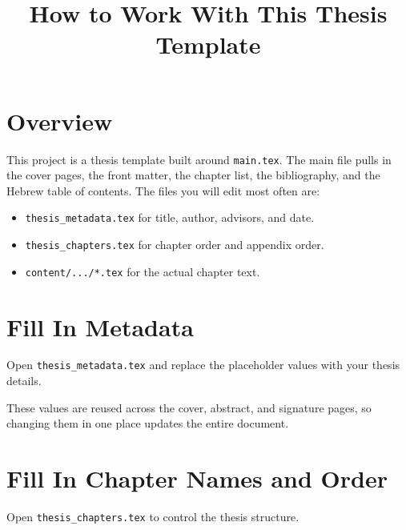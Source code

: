 \documentclass[11pt,a4paper]{article}
\title{How to Work With This Thesis Template}
\author{}
\date{}
\begin{document}
\maketitle

\section{Overview}
This project is a thesis template built around \texttt{main.tex}. The main file pulls in the cover pages, the front matter, the chapter list, the bibliography, and the Hebrew table of contents. The files you will edit most often are:
\begin{itemize}[leftmargin=*]
    \item \texttt{thesis\_metadata.tex} for title, author, advisors, and date.
    \item \texttt{thesis\_chapters.tex} for chapter order and appendix order.
    \item \texttt{content/.../*.tex} for the actual chapter text.
\end{itemize}

\section{Fill In Metadata}
Open \texttt{thesis\_metadata.tex} and replace the placeholder values with your thesis details.


These values are reused across the cover, abstract, and signature pages, so changing them in one place updates the entire document.

\section{Fill In Chapter Names and Order}
Open \texttt{thesis\_chapters.tex} to control the thesis structure.
\end{document}
